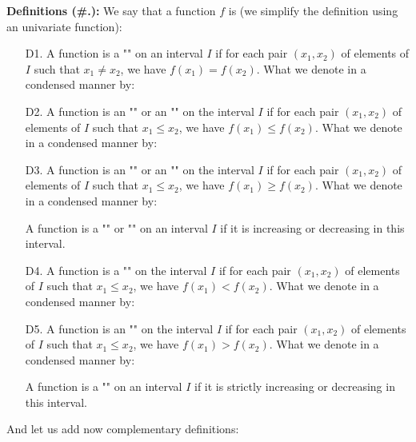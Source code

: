 	\textbf{Definitions (\#\thesection.\mydef):} We say that a function $f$ is (we simplify the definition using an univariate function):
	\begin{itemize}
		\item[D1.] A function is a "" on an interval $I$ if for each pair $(x_1,x_2)$ of elements of $I$ such that $x_1\neq x_2$, we have $f(x_1)=f(x_2)$. What we denote in a condensed manner by:
		
		
		\item[D2.] A function is an "" or an "" on the interval $I$ if for each pair $(x_1,x_2)$ of elements of $I$ such that $x_1\leq x_2$, we have $f(x_1)\leq f(x_2)$. What we denote in a condensed manner by:
		
		
		\item[D3.] A function is an "" or an "" on the interval $I$ if for each pair $(x_1,x_2)$ of elements of $I$ such that $x_1\leq x_2$, we have $f(x_1)\geq f(x_2)$. What we denote in a condensed manner by:
		
		\begin{tcolorbox}[title=Remark,arc=10pt,breakable,drop lifted shadow,
  skin=enhanced,
  skin first is subskin of={enhancedfirst}{arc=10pt,no shadow},
  skin middle is subskin of={enhancedmiddle}{arc=10pt,no shadow},
  skin last is subskin of={enhancedlast}{drop lifted shadow}]
		A function is a "" or "" on an interval $I$ if it is increasing or decreasing in this interval.
		\end{tcolorbox}
		
		\item[D4.] A function is a "" on the interval $I$ if for each pair $(x_1,x_2)$ of elements of $I$ such that $x_1\leq x_2$, we have $f(x_1)< f(x_2)$. What we denote in a condensed manner by:
		
		
		\item[D5.] A function is an "" on the interval $I$ if for each pair $(x_1,x_2)$ of elements of $I$ such that $x_1\leq x_2$, we have $f(x_1)> f(x_2)$. What we denote in a condensed manner by:
		
		\begin{tcolorbox}[title=Remark,arc=10pt,breakable,drop lifted shadow,
  skin=enhanced,
  skin first is subskin of={enhancedfirst}{arc=10pt,no shadow},
  skin middle is subskin of={enhancedmiddle}{arc=10pt,no shadow},
  skin last is subskin of={enhancedlast}{drop lifted shadow}]
		A function is a "" on an interval $I$ if it is strictly increasing or decreasing in this interval.
		\end{tcolorbox}
	\end{itemize}
	And let us add now complementary definitions:
	
